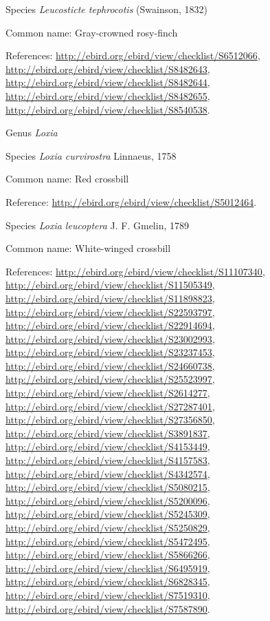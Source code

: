 \documentclass[9pt, article]{memoir}
\begin{document}
\begin{multicols}{2}
\vspace{6pt}\noindent\hspace{36pt}Species \textit{Leucosticte tephrocotis} (Swainson, 1832)


Common name: Gray-crowned rosy-finch

References: 
\url{http://ebird.org/ebird/view/checklist/S6512066}, 
\url{http://ebird.org/ebird/view/checklist/S8482643}, 
\url{http://ebird.org/ebird/view/checklist/S8482644}, 
\url{http://ebird.org/ebird/view/checklist/S8482655}, 
\url{http://ebird.org/ebird/view/checklist/S8540538}.

\vspace{6pt}\noindent\hspace{30pt}Genus \textit{Loxia}


\vspace{6pt}\noindent\hspace{36pt}Species \textit{Loxia curvirostra} Linnaeus, 1758


Common name: Red crossbill

Reference: 
\url{http://ebird.org/ebird/view/checklist/S5012464}.

\vspace{6pt}\noindent\hspace{36pt}Species \textit{Loxia leucoptera} J. F. Gmelin, 1789


Common name: White-winged crossbill

References: 
\url{http://ebird.org/ebird/view/checklist/S11107340}, 
\url{http://ebird.org/ebird/view/checklist/S11505349}, 
\url{http://ebird.org/ebird/view/checklist/S11898823}, 
\url{http://ebird.org/ebird/view/checklist/S22593797}, 
\url{http://ebird.org/ebird/view/checklist/S22914694}, 
\url{http://ebird.org/ebird/view/checklist/S23002993}, 
\url{http://ebird.org/ebird/view/checklist/S23237453}, 
\url{http://ebird.org/ebird/view/checklist/S24660738}, 
\url{http://ebird.org/ebird/view/checklist/S25523997}, 
\url{http://ebird.org/ebird/view/checklist/S2614277}, 
\url{http://ebird.org/ebird/view/checklist/S27287401}, 
\url{http://ebird.org/ebird/view/checklist/S27356850}, 
\url{http://ebird.org/ebird/view/checklist/S3891837}, 
\url{http://ebird.org/ebird/view/checklist/S4153449}, 
\url{http://ebird.org/ebird/view/checklist/S4157583}, 
\url{http://ebird.org/ebird/view/checklist/S4342574}, 
\url{http://ebird.org/ebird/view/checklist/S5080215}, 
\url{http://ebird.org/ebird/view/checklist/S5200096}, 
\url{http://ebird.org/ebird/view/checklist/S5245309}, 
\url{http://ebird.org/ebird/view/checklist/S5250829}, 
\url{http://ebird.org/ebird/view/checklist/S5472495}, 
\url{http://ebird.org/ebird/view/checklist/S5866266}, 
\url{http://ebird.org/ebird/view/checklist/S6495919}, 
\url{http://ebird.org/ebird/view/checklist/S6828345}, 
\url{http://ebird.org/ebird/view/checklist/S7519310}, 
\url{http://ebird.org/ebird/view/checklist/S7587890}.


\end{multicols}
\end{document}
